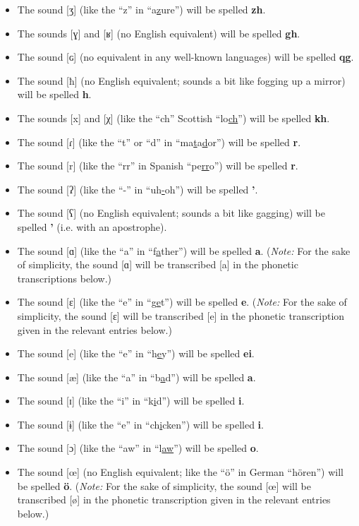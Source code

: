 \documentclass[oneside]{book}
\begin{document}
\begin{itemize}
\item
The sound [ʒ] (like the ``z'' in ``a\uline{z}ure'') will be spelled \textbf{zh}.
\item
The sounds [ɣ] and [ʁ] (no English equivalent) will be spelled \textbf{gh}.
\item
The sound [ɢ] (no equivalent in any well-known languages) will be spelled \textbf{qg}.
\item
The sound [ħ] (no English equivalent; sounds a bit like fogging up a mirror) will be spelled \textbf{h}.
\item
The sounds [x] and [χ] (like the ``ch'' Scottish ``lo\uline{ch}'') will be spelled \textbf{kh}.
\item
The sound [ɾ] (like the ``t'' or ``d'' in ``ma\uline{t}a\uline{d}or'') will be spelled \textbf{r}.
\item
The sound [r] (like the ``rr'' in Spanish ``pe\uline{rr}o'') will be spelled \textbf{r}.
\item
The sound [ʔ] (like the ``-'' in ``uh\uline{-}oh'') will be spelled \textbf{'}.
\item
The sound [ʕ] (no English equivalent; sounds a bit like gagging) will be spelled \textbf{'} (i.e. with an apostrophe).
\item
The sound [ɑ] (like the ``a'' in ``f\uline{a}ther'') will be spelled \textbf{a}.
(\emph{Note:} For the sake of simplicity, the sound [ɑ] will be transcribed [a] in the phonetic transcriptions below.)
\item
The sound [ɛ] (like the ``e'' in ``g\uline{e}t'') will be spelled \textbf{e}.
(\emph{Note:} For the sake of simplicity, the sound [ɛ] will be transcribed [e] in the phonetic transcription given in the relevant entries below.)
\item
The sound [e] (like the ``e'' in ``h\uline{e}y'') will be spelled \textbf{ei}.
\item
The sound [æ] (like the ``a'' in ``b\uline{a}d'') will be spelled \textbf{a}.
\item
The sound [ɪ] (like the ``i'' in ``k\uline{i}d'') will be spelled \textbf{i}.
\item
The sound [ɨ] (like the ``e'' in ``ch\uline{i}cken'') will be spelled \textbf{i}.
\item
The sound [ɔ] (like the ``aw'' in ``l\uline{aw}'') will be spelled \textbf{o}.
\item
The sound [œ] (no English equivalent; like the ``ö'' in German ``hören'') will be spelled \textbf{ö}.
(\emph{Note:} For the sake of simplicity, the sound [œ] will be transcribed [ø] in the phonetic transcription given in the relevant entries below.)

\end{itemize}
\end{document}

